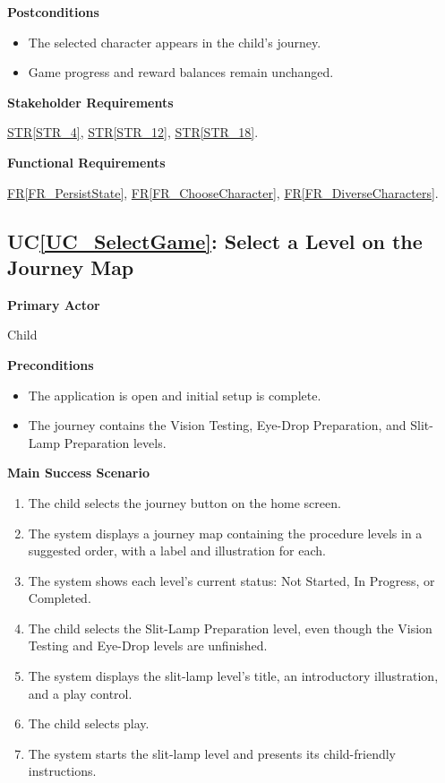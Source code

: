 \documentclass[10pt]{article}
\makeatletter
\newcommand{\strref}[1]{\hyperref[#1]{STR\ref*{#1}}}
\newcounter{ucnum} %
\newcommand{\ucheading}[1]{UC\ref*{#1}}
\newcommand{\termsecnum}{\ifnum\value{subsection}=0 \thesection\else\thesubsection\fi}
\newcommand{\termmark}[1]{%
  \hypertarget{term:#1}{}%
  \protected@write\@auxout{}{\string\newlabel{termsec:#1}{{\termsecnum}{\thepage}{}{}{}}}%
}
\newcommand{\rref}[1]{\hyperref[#1]{FR\ref*{#1}}}
\makeatother
\begin{document}
\textbf{Postconditions}
\begin{itemize}
    \item The selected character appears in the child's journey.
    \item \termmark{gameprogress}Game progress and reward balances remain unchanged.
\end{itemize}

\textbf{Stakeholder Requirements}

\strref{STR_4}, \strref{STR_12}, \strref{STR_18}.

\textbf{Functional Requirements}

\rref{FR_PersistState}, \rref{FR_ChooseCharacter}, \rref{FR_DiverseCharacters}.

\label{UC_SelectGame}
\subsection{\ucheading{UC_SelectGame}: Select a Level on the Journey Map}

\textbf{Primary Actor}

Child

\textbf{Preconditions}
\begin{itemize}
    \item The application is open and initial setup is complete.
    \item The journey contains the Vision Testing, Eye-Drop Preparation,
    and Slit-Lamp Preparation levels.
\end{itemize}

\textbf{Main Success Scenario}
\begin{enumerate}
    \item The child selects the journey button on the home screen.
    \item The system displays a journey map containing the procedure
    levels in a suggested order, with a label and illustration for each.
    \item The system shows each level's current status: Not Started,
    In Progress, or Completed.
    \item The child selects the Slit-Lamp Preparation level, even
    though the Vision Testing and Eye-Drop levels are unfinished.
    \item The system displays the slit-lamp level's title, an
    introductory illustration, and a play control.
    \item The child selects play.
    \item The system starts the slit-lamp level and presents its
    child-friendly instructions.
\end{enumerate}
\end{document}
